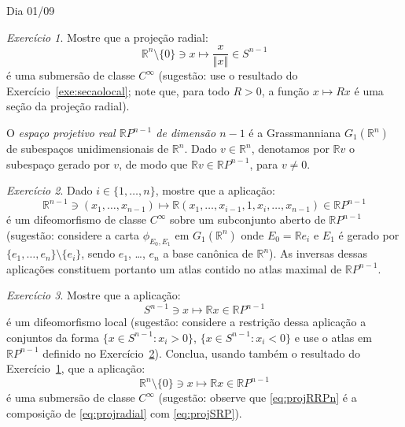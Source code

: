 \documentclass[oneside,11pt]{amsart}
\newcommand{\R}{\mathds R}
\theoremstyle{remark}\newtheorem{exercise}{Exercício}[section]
\theoremstyle{plain}\newtheorem{teo}{Teorema}[section]
\theoremstyle{plain}\newtheorem{lem}[teo]{Lema}
\theoremstyle{plain}\newtheorem{prop}[teo]{Proposição}
\theoremstyle{definition}\newtheorem{defin}[teo]{Definição}
\theoremstyle{remark}\newtheorem{rem}[teo]{Observação}
\theoremstyle{definition}\newtheorem{example}[teo]{Exemplo}
\numberwithin{equation}{section}
\begin{document}
\begin{section}{Dia 01/09}

\begin{exercise}\label{exe:projradial}
Mostre que a projeção radial:
\begin{equation}\label{eq:projradial}
\R^n\setminus\{0\}\ni x\longmapsto\frac x{\Vert x\Vert}\in S^{n-1}
\end{equation}
é uma submersão de classe $C^\infty$ (sugestão: use o resultado do Exercício~\ref{exe:secaolocal}; note que, para todo $R>0$, a função
$x\mapsto Rx$ é uma seção da projeção radial).
\end{exercise}

O {\em espaço projetivo real $\R P^{n-1}$ de dimensão $n-1$\/} é a Grassmanniana $G_1(\R^n)$ de subespaços unidimensionais de $\R^n$. Dado
$v\in\R^n$, denotamos por $\R v$ o subespaço gerado por $v$, de modo que $\R v\in\R P^{n-1}$, para $v\ne0$.
\begin{exercise}\label{exe:cartasRP}
Dado $i\in\{1,\ldots,n\}$, mostre que a aplicação:
\[\R^{n-1}\ni(x_1,\ldots,x_{n-1})\longmapsto\R(x_1,\ldots,x_{i-1},1,x_i,\ldots,x_{n-1})\in\R P^{n-1}\]
é um difeomorfismo de classe $C^\infty$ sobre um subconjunto aberto de $\R P^{n-1}$ (sugestão: considere a carta $\phi_{E_0,E_1}$ em
$G_1(\R^n)$ onde $E_0=\R e_i$ e $E_1$ é gerado por $\{e_1,\ldots,e_n\}\setminus\{e_i\}$, sendo $e_1$, \dots, $e_n$ a base canônica de $\R^n$).
As inversas dessas aplicações constituem portanto um atlas contido no atlas maximal de $\R P^{n-1}$.
\end{exercise}

\begin{exercise}
Mostre que a aplicação:
\begin{equation}\label{eq:projSRP}
S^{n-1}\ni x\longmapsto\R x\in\R P^{n-1}
\end{equation}
é um difeomorfismo local (sugestão: considere a restrição dessa aplicação a conjuntos da forma
$\big\{x\in S^{n-1}:x_i>0\big\}$, $\big\{x\in S^{n-1}:x_i<0\big\}$ e use o atlas em $\R P^{n-1}$ definido
no Exercício~\ref{exe:cartasRP}). Conclua, usando também o resultado do Exercício~\ref{exe:projradial},
que a aplicação:
\begin{equation}\label{eq:projRRPn}
\R^n\setminus\{0\}\ni x\longmapsto\R x\in\R P^{n-1}
\end{equation}
é uma submersão de classe $C^\infty$ (sugestão: observe que \eqref{eq:projRRPn} é a composição de \eqref{eq:projradial} com \eqref{eq:projSRP}).
\end{exercise}


\end{section}
\end{document}
